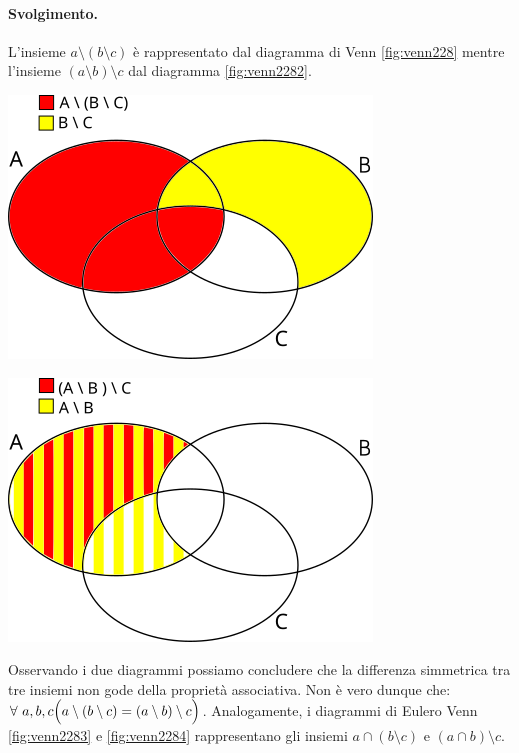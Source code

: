 \paragraph{Svolgimento.}
L'insieme $a\setminus(b\setminus c)$ è rappresentato dal diagramma di Venn \ref{fig:venn228} mentre l'insieme $(a\setminus b)\setminus c$ dal diagramma \ref{fig:venn2282}.
\begin{center}
	\begin{minipage}{.45\textwidth}
		\centering
		\includegraphics[scale=0.6]{res/path33251.png}
		\label{fig:venn228}
	\end{minipage}
	\hfil
	\begin{minipage}{.45\textwidth}
		\centering
		\includegraphics[scale=0.6]{res/path2879.png}
		\label{fig:venn2282}
	\end{minipage}
\end{center}
Osservando i due diagrammi possiamo concludere che la differenza simmetrica tra tre insiemi non gode della proprietà associativa. Non è vero dunque che:
$\forall \ a,b,c \Bigl(a \setminus (b\setminus c) = (a \setminus b) \setminus c \Bigr)$. Analogamente, i diagrammi di Eulero Venn \ref{fig:venn2283} e \ref{fig:venn2284} rappresentano gli insiemi $a\cap(b \setminus c)$ e $(a \cap b) \setminus c$.
